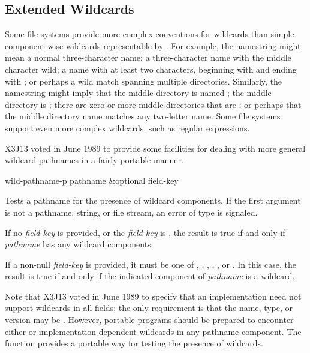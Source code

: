 \begin{newer}
\subsection{Extended Wildcar{\kern-1pt}ds}
\label{WILD-PATHNAME-SECTION}


  Some file systems provide more complex conventions for wildcards than
  simple component-wise wildcards representable by .
For example, the namestring  might mean a normal three-character
name; a three-character name with the middle character wild;
a name with at least two characters, beginning with  and ending with ;
or perhaps a wild match spanning multiple directories.  Similarly, the
namestring  might imply that the middle directory is
named ; the middle directory is ;
there are zero or more middle directories that are ;
or perhaps that the middle directory name matches any two-letter name.
Some file systems support even more complex wildcards, such as
  regular expressions.

X3J13 voted in June 1989  to provide
some facilities for dealing with more general wildcard pathnames
in a fairly portable manner.

\begin{defun}[Function]
wild-pathname-p pathname &optional field-key
  
    Tests a pathname for the presence of wildcard components.  If the first
    argument is not a pathname, string, or file stream, an error of type
     is signaled.
  
    If no \emph{field-key} is provided, or the \emph{field-key} is , the result is
    true if and only if \emph{pathname} has any wildcard components.

    If a non-null \emph{field-key} is provided, it must be one of , ,
    , , , or .
    In this case, the result is true if and only
    if the indicated component of \emph{pathname} is a wildcard.

    Note that X3J13 voted in June 1989 
    to specify that an implementation need not support wildcards in all fields;
    the only requirement is that the name, type, or version may be .
    However, portable programs should be prepared to encounter either 
    or implementation-dependent wildcards in any pathname component.
    The function  provides a portable way for testing
    the presence of wildcards.
\end{defun}


\end{newer}
